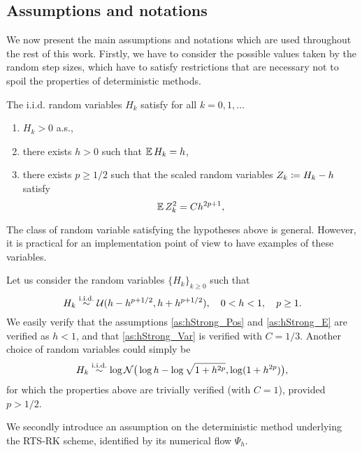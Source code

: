 \documentclass[10pt]{article}
\begin{document}
\subsection{Assumptions and notations} We now present the main assumptions and notations which are used throughout the rest of this work. Firstly, we have to consider the possible values taken by the random step sizes, which have to satisfy restrictions that are necessary not to spoil the properties of deterministic methods. 
\begin{assumption}\label{as:hStrong} The i.i.d. random variables $H_k$ satisfy for all $k = 0, 1, \ldots$
	\begin{enumerate}
		\item\label{as:hStrong_Pos} $H_k > 0$ a.s.,
		\item\label{as:hStrong_E} there exists $h > 0$ such that $\operatorname{\mathbb{E}} H_k = h$,
		\item\label{as:hStrong_Var} there exists $p \geq 1/2$ such that the scaled random variables $Z_k \coloneqq H_k - h$ satisfy
		\begin{equation}
			\operatorname{\mathbb{E}} Z_k^2 = Ch^{2p+1},
		\end{equation}
	\end{enumerate}
\end{assumption}
The class of random variable satisfying the hypotheses above is general. However, it is practical for an implementation point of view to have examples of these variables.
\begin{example}\label{ex:uniformH} Let us consider the random variables $\{H_k\}_{k\geq 0}$ such that
	\begin{equation}
	H_k \stackrel{\text{i.i.d.}}{\sim} \mathcal{U}(h-h^{p+1/2}, h+h^{p+1/2}), \quad 0 < h < 1, \quad p \geq 1.
	\end{equation}
	We easily verify that the assumptions \ref{as:hStrong_Pos} and \ref{as:hStrong_E} are verified as $h < 1$, and that \ref{as:hStrong_Var} is verified with $C = 1/3$. Another choice of random variables could simply be 
	\begin{equation}
	H_k \stackrel{\text{i.i.d.}}{\sim} \log\mathcal{N}\big(\log h - \log\sqrt{1 + h^{2p}}, \log(1 + h^{2p})\big),
	\end{equation}
	for which the properties above are trivially verified (with $C = 1$), provided $p > 1/2$.
\end{example}
We secondly introduce an assumption on the deterministic  method underlying the RTS-RK scheme, identified by its numerical flow $\Psi_h$. 
\end{document}
